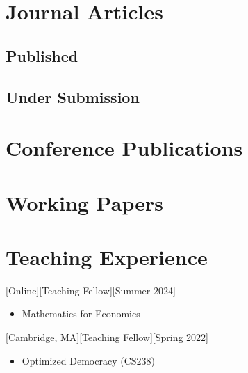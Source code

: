 \documentclass{article}
\begin{document}
	\section{Journal Articles}
	
	\subsection{Published}
	\vspace{-.3em}
	
    \begin{etaremune}
    [
    	leftmargin=3.5ex]
        
    \end{etaremune}
    
    
    \subsection{Under Submission}
    \vspace{-.3em}
    \begin{etaremune}
    [
    	leftmargin=3.5ex]
        
    \end{etaremune}
    


    \section{Conference Publications}
    \begin{etaremune}
    	[itemsep=0ex,
    	leftmargin=3.5ex]
        
    \end{etaremune}
    
    \section{Working Papers}
    \begin{etaremune}
    	[itemsep=0ex,
    	leftmargin=3.5ex]
        
    \end{etaremune}
    

    
    \section{Teaching Experience}
    [Online][Teaching Fellow][Summer 2024]
    \begin{itemize}
    	\item Mathematics for Economics
    \end{itemize}
    [Cambridge, MA][Teaching Fellow][Spring 2022]
    \begin{itemize}
        \item Optimized Democracy (CS238)
    \end{itemize}
    
\end{document}
